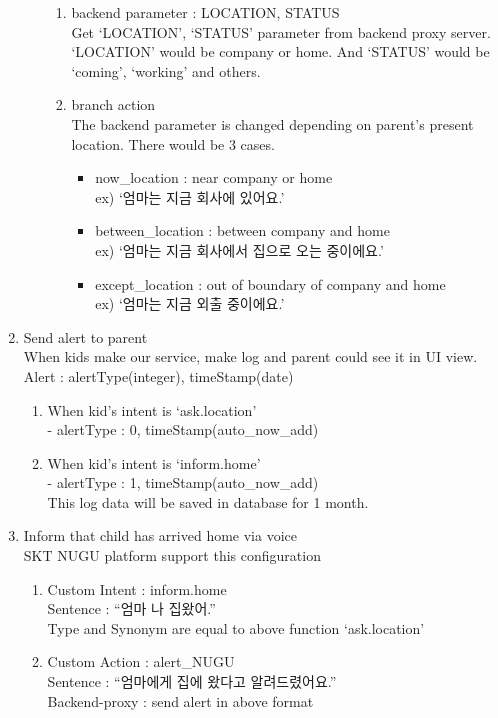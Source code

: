 \documentclass[conference]{IEEEtran}
\begin{document}
\begin{enumerate}
\begin{enumerate}
\begin{enumerate}
            \item backend parameter : LOCATION, STATUS\\
            Get ‘LOCATION’, ‘STATUS’ parameter from backend proxy server. ‘LOCATION’ would be company or home. And ‘STATUS’ would be ‘coming’, ‘working’ and others.\\
            \item branch action\\
            The backend parameter is changed depending on parent’s present location. There would be 3 cases.
            \begin{itemize}
                \item now\_location : near company or home\\
                ex) ‘엄마는 지금 회사에 있어요.’
                \item between\_location : between company and home\\
                ex) ‘엄마는 지금 회사에서 집으로 오는 중이에요.’
                \item except\_location : out of boundary of company and home\\
                ex) ‘엄마는 지금 외출 중이에요.’\\
            \end{itemize}
        \end{enumerate}
    \end{enumerate}
    \item Send alert to parent\\
    When kids make our service, make log and parent could see it in UI view.\\
    Alert : alertType(integer), timeStamp(date)
    \begin{enumerate}
        \item When kid’s intent is ‘ask.location’\\
        - alertType : 0, timeStamp(auto\_now\_add)
        \item When kid’s intent is ‘inform.home’\\
        - alertType : 1, timeStamp(auto\_now\_add)\\
        This log data will be saved in database for 1 month.\\
    \end{enumerate}
    \item Inform that child has arrived home via voice\\
    SKT NUGU platform support this configuration
    \begin{enumerate}
        \item Custom Intent : inform.home\\
		Sentence : “엄마 나 집왔어.”\\
        Type and Synonym are equal to above function ‘ask.location’
        \item Custom Action : alert\_NUGU\\
		Sentence : “엄마에게 집에 왔다고 알려드렸어요.”\\
		Backend-proxy : send alert in above format


\end{enumerate}
\end{enumerate}
\end{document}

